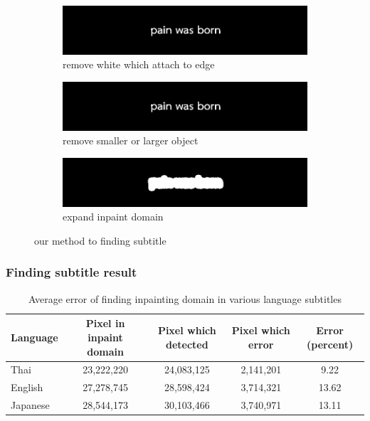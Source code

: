 \documentclass[xcolor=dvipsnames, xetex,serif]{beamer}
\begin{document}
\begin{frame}
\begin{figure}[H]
\begin{subfigure}{0.4\linewidth}
            \end{subfigure}
            \begin{subfigure}{0.4\linewidth}
                \centering
                \includegraphics[width=0.8\linewidth]{images/subtitle_detection/detection-blackfill.png}
                \caption{remove white which attach to edge}
            \end{subfigure}
            \begin{subfigure}{0.4\linewidth}
                \centering
                \includegraphics[width=0.8\linewidth]{images/subtitle_detection/detection-erode-opening.png}
                \caption{remove smaller or larger object}
            \end{subfigure}
            \begin{subfigure}{0.4\linewidth}
                \centering
                \includegraphics[width=0.8\linewidth]{images/subtitle_detection/detection-stoke.png}
                \caption{expand inpaint domain}
            \end{subfigure}
            \caption{our method to finding subtitle}
        \end{figure}
    \end{frame}
    \begin{frame}
        \frametitle{Finding subtitle result}
        \begin{table}[H]
            \centering
            \footnotesize
            \begin{tabular}[ht]{|l|c|c|c|c|}
                \hline
                Language  & Pixel in inpaint domain & Pixel which detected & Pixel which error & Error (percent) \\
                \hline
                Thai & 23,222,220 & 24,083,125 & 2,141,201 & 9.22 \\
                English & 27,278,745 & 28,598,424 & 3,714,321 & 13.62 \\
                Japanese & 28,544,173 & 30,103,466 & 3,740,971 & 13.11 \\
                \hline
            \end{tabular}
            \caption{Average error of finding inpainting domain in various language subtitles}
        \end{table}	
    \end{frame}
\end{document}
